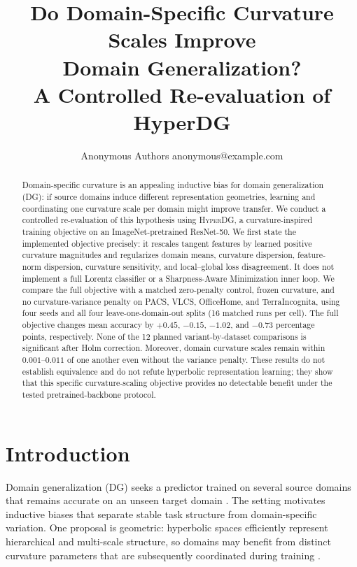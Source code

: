 \documentclass[10pt]{article}
\title{Do Domain-Specific Curvature Scales Improve\\
Domain Generalization?\\
A Controlled Re-evaluation of HyperDG}
\author{\name Anonymous Authors \email anonymous@example.com}
\newcommand{\method}{\textsc{HyperDG}}
\begin{document}
\maketitle

\begin{abstract}
Domain-specific curvature is an appealing inductive bias for domain
generalization (DG): if source domains induce different representation
geometries, learning and coordinating one curvature scale per domain might
improve transfer. We conduct a controlled re-evaluation of this hypothesis
using \method, a curvature-inspired training objective on an
ImageNet-pretrained ResNet-50. We first state the implemented objective
precisely: it rescales tangent features by learned positive curvature
magnitudes and regularizes domain means, curvature dispersion, feature-norm
dispersion, curvature sensitivity, and local--global loss disagreement. It
does not implement a full Lorentz classifier or a Sharpness-Aware
Minimization inner loop. We compare the full objective with a matched
zero-penalty control, frozen curvature, and no curvature-variance penalty on
PACS, VLCS, OfficeHome, and TerraIncognita, using four seeds and all four
leave-one-domain-out splits (16 matched runs per cell). The full objective
changes mean accuracy by $+0.45$, $-0.15$, $-1.02$, and $-0.73$ percentage
points, respectively. None of the 12 planned variant-by-dataset comparisons
is significant after Holm correction. Moreover, domain curvature scales
remain within $0.001$--$0.011$ of one another even without the variance
penalty. These results do not establish equivalence and do not refute
hyperbolic representation learning; they show that this specific
curvature-scaling objective provides no detectable benefit under the tested
pretrained-backbone protocol.
\end{abstract}

\section{Introduction}
\label{sec:introduction}

Domain generalization (DG) seeks a predictor trained on several source
domains that remains accurate on an unseen target domain
\citep{wang2022generalizing,gulrajani2020search}. The setting motivates
inductive biases that separate stable task structure from domain-specific
variation. One proposal is geometric: hyperbolic spaces efficiently represent
hierarchical and multi-scale structure, so domains may benefit from distinct
curvature parameters that are subsequently coordinated during training
\citep{chami2020trees,fan2025curvaturelearning,bi2025hyperbolic}.
\end{document}
